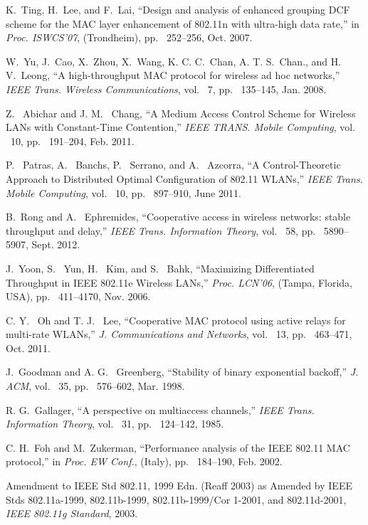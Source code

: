 \documentclass[10pt,twocolumn,oneside,submit]{JCNtran}
\begin{document}
\begin{thebibliography}{22}
K.~Ting, H.~Lee, and F.~Lai, ``Design and analysis of enhanced grouping DCF scheme for the MAC layer enhancement of 802.11n with ultra-high data rate,'' in {\em Proc. ISWCS'07}, (Trondheim), pp. ~252--256, Oct. 2007.

W.~Yu, J.~Cao, X.~Zhou, X.~Wang, K. C. C.~Chan, A. T. S.~Chan., and H. V.~Leong, ``A high-throughput MAC protocol for wireless ad hoc networks,'' {\em IEEE Trans. Wireless Communications}, vol. ~7, pp. ~135--145, Jan. 2008.

Z. ~Abichar and J. M. ~Chang, ``A Medium Access Control Scheme for Wireless LANs with Constant-Time Contention,'' {\em IEEE TRANS. Mobile Computing}, vol. ~10, pp. ~191--204, Feb. 2011.

P. ~Patras, A. ~Banchs, P. ~Serrano, and A. ~Azcorra, ``A Control-Theoretic Approach to Distributed Optimal Configuration of 802.11 WLANs,'' {\em IEEE Trans. Mobile Computing}, vol. ~10, pp. ~897--910, June 2011.

B.~Rong and A. ~Ephremides, ``Cooperative access in wireless networks: stable throughput and delay,'' {\em IEEE Trans. Information Theory}, vol. ~58, pp. ~5890--5907, Sept. 2012.

J.~Yoon, S. ~Yun, H. ~Kim, and S. ~Bahk, ``Maximizing Differentiated Throughput in IEEE 802.11e Wireless LANs,'' {\em Proc. LCN'06}, (Tampa, Florida, USA), pp. ~411--4170, Nov. 2006.

C. Y. ~Oh and T. J. ~Lee, ``Cooperative MAC protocol using active relays for multi-rate WLANs,'' {\em J. Communications and Networks}, vol. ~13, pp. ~463--471, Oct. 2011.

J.~Goodman and A. G. ~Greenberg, ``Stability of binary exponential backoff,'' {\em J. ACM}, vol. ~35, pp. ~576--602, Mar. 1998.

R. G.~Gallager, ``A perspective on multiaccess channels,'' {\em IEEE Trans. Information Theory}, vol. ~31, pp. ~124--142, 1985.

C. H.~Foh and M.~Zukerman, ``Performance analysis of the IEEE 802.11 MAC protocol,'' in {\em Proc. EW Conf.}, (Italy), pp. ~184--190, Feb. 2002.

Amendment to IEEE Std 802.11, 1999 Edn. (Reaff 2003) as Amended by IEEE Stds 802.11a-1999, 802.11b-1999, 802.11b-1999/Cor 1-2001, and 802.11d-2001, {\em IEEE 802.11g Standard}, 2003.

\end{thebibliography}
\end{document}
